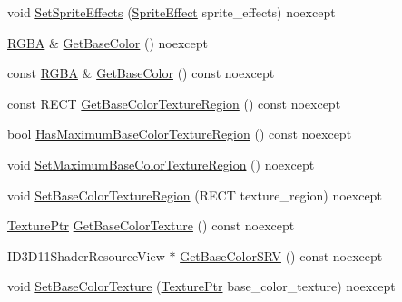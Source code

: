 \begin{DoxyCompactItemize}
\item 
void \mbox{\hyperlink{classmage_1_1rendering_1_1_sprite_image_a504ebb2cdc216d26bdbcb24cfa5466d4}{Set\+Sprite\+Effects}} (\mbox{\hyperlink{namespacemage_1_1rendering_a4dbc3536c87b906f1d41d863ec458e78}{Sprite\+Effect}} sprite\+\_\+effects) noexcept
\item 
\mbox{\hyperlink{structmage_1_1_r_g_b_a}{R\+G\+BA}} \& \mbox{\hyperlink{classmage_1_1rendering_1_1_sprite_image_ab1ef6e7677aa9e98fa55b6d64befdd63}{Get\+Base\+Color}} () noexcept
\item 
const \mbox{\hyperlink{structmage_1_1_r_g_b_a}{R\+G\+BA}} \& \mbox{\hyperlink{classmage_1_1rendering_1_1_sprite_image_a8d86a293c822486ab1cf37a31c2b0b74}{Get\+Base\+Color}} () const noexcept
\item 
const R\+E\+CT \mbox{\hyperlink{classmage_1_1rendering_1_1_sprite_image_ae8d120b87e4791cf85799623ae554f41}{Get\+Base\+Color\+Texture\+Region}} () const noexcept
\item 
bool \mbox{\hyperlink{classmage_1_1rendering_1_1_sprite_image_a89e9dd78d50c2c312e06686bcc7347c1}{Has\+Maximum\+Base\+Color\+Texture\+Region}} () const noexcept
\item 
void \mbox{\hyperlink{classmage_1_1rendering_1_1_sprite_image_a5b0a8abc53768cce82c3c2f8f1a96745}{Set\+Maximum\+Base\+Color\+Texture\+Region}} () noexcept
\item 
void \mbox{\hyperlink{classmage_1_1rendering_1_1_sprite_image_a54b349a9f73c7d6f3ded4a3d1f3172bf}{Set\+Base\+Color\+Texture\+Region}} (R\+E\+CT texture\+\_\+region) noexcept
\item 
\mbox{\hyperlink{namespacemage_1_1rendering_a6f3ae54f825328465b0cdde0f0de4a36}{Texture\+Ptr}} \mbox{\hyperlink{classmage_1_1rendering_1_1_sprite_image_ab5b257c4df82dc72223affe8b32c0b70}{Get\+Base\+Color\+Texture}} () const noexcept
\item 
I\+D3\+D11\+Shader\+Resource\+View $\ast$ \mbox{\hyperlink{classmage_1_1rendering_1_1_sprite_image_a7dceee8dfe1432948a77f0563d6b70a3}{Get\+Base\+Color\+S\+RV}} () const noexcept
\item 
void \mbox{\hyperlink{classmage_1_1rendering_1_1_sprite_image_a363b30407434dea9d3069142ff8c4059}{Set\+Base\+Color\+Texture}} (\mbox{\hyperlink{namespacemage_1_1rendering_a6f3ae54f825328465b0cdde0f0de4a36}{Texture\+Ptr}} base\+\_\+color\+\_\+texture) noexcept
\end{DoxyCompactItemize}
